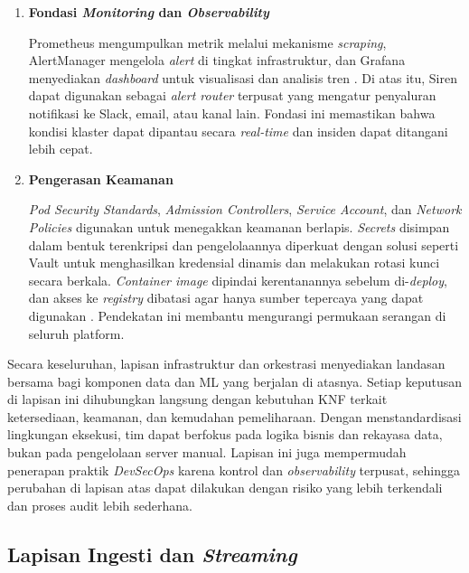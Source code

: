 \begin{enumerate}
    \vspace{0.5em}

    \item \textbf{Fondasi \textit{Monitoring} dan \textit{Observability}}  

    Prometheus mengumpulkan metrik melalui mekanisme \textit{scraping}, AlertManager mengelola \textit{alert} di tingkat infrastruktur, dan Grafana menyediakan \textit{dashboard} untuk visualisasi dan analisis tren \autocite{prometheus2024,grafana2024}. Di atas itu, Siren dapat digunakan sebagai \textit{alert router} terpusat yang mengatur penyaluran notifikasi ke Slack, email, atau kanal lain. Fondasi ini memastikan bahwa kondisi klaster dapat dipantau secara \textit{real-time} dan insiden dapat ditangani lebih cepat.

    \vspace{0.5em}

    \item \textbf{Pengerasan Keamanan}  

    \textit{Pod Security Standards}, \textit{Admission Controllers}, \textit{Service Account}, dan \textit{Network Policies} digunakan untuk menegakkan keamanan berlapis. \textit{Secrets} disimpan dalam bentuk terenkripsi dan pengelolaannya diperkuat dengan solusi seperti Vault untuk menghasilkan kredensial dinamis dan melakukan rotasi kunci secara berkala. \textit{Container image} dipindai kerentanannya sebelum di-\textit{deploy}, dan akses ke \textit{registry} dibatasi agar hanya sumber tepercaya yang dapat digunakan \autocite{ahmad2024mlops}. Pendekatan ini membantu mengurangi permukaan serangan di seluruh platform.

    \vspace{0.5em}
\end{enumerate}

Secara keseluruhan, lapisan infrastruktur dan orkestrasi menyediakan landasan bersama bagi komponen data dan ML yang berjalan di atasnya. Setiap keputusan di lapisan ini dihubungkan langsung dengan kebutuhan KNF terkait ketersediaan, keamanan, dan kemudahan pemeliharaan. Dengan menstandardisasi lingkungan eksekusi, tim dapat berfokus pada logika bisnis dan rekayasa data, bukan pada pengelolaan server manual. Lapisan ini juga mempermudah penerapan praktik \textit{DevSecOps} karena kontrol dan \textit{observability} terpusat, sehingga perubahan di lapisan atas dapat dilakukan dengan risiko yang lebih terkendali dan proses audit lebih sederhana.

\subsection{Lapisan Ingesti dan \textit{Streaming}}

